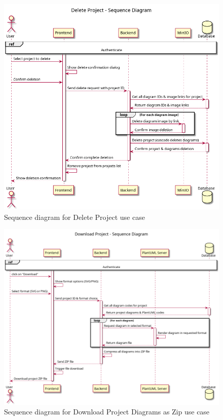 \begin{figure}[H]
\centering
\includegraphics[width=\textwidth]{conception/SprintIII/sequence_diagrams/sequence_projectManagement_3_4_DeleteProject.png}
\caption{Sequence diagram for Delete Project use case}
\label{fig:seq_delete_project}
\end{figure}

\begin{figure}[H]
\centering
\includegraphics[width=\textwidth]{conception/SprintIII/sequence_diagrams/sequence_projectManagement_3_5_DownloadProjectDiagramsAsZip.png}
\caption{Sequence diagram for Download Project Diagrams as Zip use case}
\label{fig:seq_download_project}
\end{figure}

